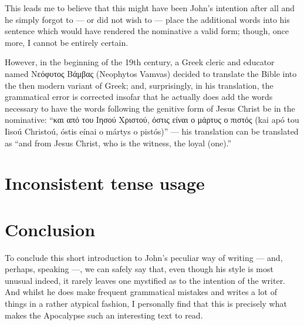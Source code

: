 This leads me to believe that this might have been John’s intention after all and he simply forgot to — or did not wish to — place the additional words into his sentence which would have rendered the nominative a valid form; though, once more, I cannot be entirely certain.

However, in the beginning of the 19th century, a Greek cleric and educator named Νεόφυτος Βάμβας (Neophytos Vamvas) decided to translate the Bible into the then modern variant of Greek; and, surprisingly, in his translation, the grammatical error is corrected insofar that he actually does add the words necessary to have the words following the genitive form of Jesus Christ be in the nominative: “και από του Ιησού Χριστού, όστις είναι ο μάρτυς ο πιστός (kai apó tou Iisoú Christoú, óstis eínai o mártys o pistós)” — his translation can be translated as “and from Jesus Christ, who is the witness, the loyal (one).”

\section*{Inconsistent tense usage}

\section*{Conclusion}
  
To conclude this short introduction to John's peculiar way of writing — and, perhaps, speaking —, we can safely say that, even though his style is most unusual indeed, it rarely leaves one mystified as to the intention of the writer. And whilst he does make frequent grammatical mistakes and writes a lot of things in a rather atypical fashion, I personally find that this is precisely what makes the Apocalypse such an interesting text to read.


  